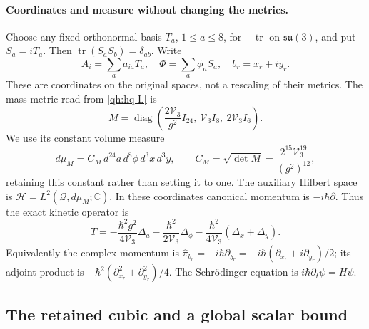\paragraph{Coordinates and measure without changing the metrics.}
Choose any fixed orthonormal basis \(T_a\), \(1\leq a\leq8\), for
\(-\operatorname{tr}\) on \(\mathfrak{su}(3)\), and put \(S_a=iT_a\).
Then \(\operatorname{tr}(S_aS_b)=\delta_{ab}\). Write
\[
 A_i=\sum_a a_{ia}T_a,\quad
 \Phi=\sum_a\phi_aS_a,\quad b_r=x_r+iy_r.
\]
These are coordinates on the original spaces, not a rescaling of their
metrics. The mass metric read from \eqref{qh:hq-L} is
\[
 M=\operatorname{diag}\left(
   \frac{2\mathcal V_3}{g^2}I_{24},\
   \mathcal V_3I_8,\
   2\mathcal V_3I_6\right).
\]
We use its constant volume measure
\[
 d\mu_M=C_M\,d^{24}a\,d^8\phi\,d^3x\,d^3y,\qquad
 C_M=\sqrt{\det M}=\frac{2^{15}\mathcal V_3^{19}}{(g^2)^{12}},
\]
retaining this constant rather than setting it to one. The auxiliary
Hilbert space is \(\mathscr H=L^2(\mathcal Q,d\mu_M;\mathbb C)\).
In these coordinates canonical momentum is \(-i\hbar\partial\).
Thus the exact kinetic operator is
\begin{equation}\label{qh:hq-kinetic}
 T=-\frac{\hbar^2g^2}{4\mathcal V_3}\Delta_a
   -\frac{\hbar^2}{2\mathcal V_3}\Delta_\phi
   -\frac{\hbar^2}{4\mathcal V_3}(\Delta_x+\Delta_y).
\end{equation}
Equivalently the complex momentum is
\(\widehat\pi_{b_r}=-i\hbar\partial_{\bar b_r}
=-i\hbar(\partial_{x_r}+i\partial_{y_r})/2\);
its adjoint product is
\(-\hbar^2(\partial_{x_r}^2+\partial_{y_r}^2)/4\).
The Schr\"odinger equation is \(i\hbar\partial_t\psi=H\psi\).

\subsection{The retained cubic and a global scalar bound}
\label{qh:scalar-bound-section}

